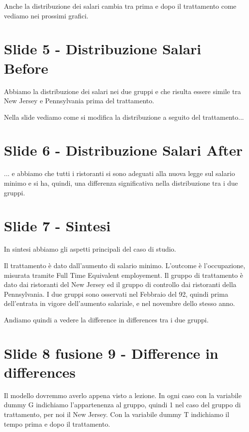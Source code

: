\documentclass{article}
\begin{document}
Anche la distribuzione dei salari cambia tra prima e dopo il trattamento come vediamo nei prossimi grafici.

\section{Slide 5 - Distribuzione Salari Before}

Abbiamo la distribuzione dei salari nei due gruppi e che risulta essere simile tra New Jersey e Pennsylvania prima del trattamento.

Nella slide vediamo come si modifica la distribuzione a seguito del trattamento...


\section{Slide 6 - Distribuzione Salari After}

... e abbiamo che tutti i ristoranti si sono adeguati alla nuova legge sul salario minimo e si ha, quindi, una differenza significativa nella distribuzione tra i due gruppi.

\section{Slide 7 - Sintesi} 

In sintesi abbiamo gli aspetti principali del caso di studio.

Il trattamento è dato dall'aumento di salario minimo. L'outcome è l'occupazione, misurata tramite Full Time Equivalent employement. Il gruppo di trattamento è dato dai ristoranti del New Jersey ed il gruppo di controllo dai ristoranti della Pennsylvania. I due gruppi sono osservati nel Febbraio del 92, quindi prima dell'entrata in vigore dell'aumento salariale, e nel novembre dello stesso anno.

Andiamo quindi a vedere la difference in differences tra i due gruppi.

\section{Slide 8 fusione 9 - Difference in differences }

Il modello dovremmo averlo appena visto a lezione. In ogni caso con la variabile dummy G indichiamo l'appartenenza al gruppo, quindi 1 nel caso del gruppo di trattamento, per noi il New Jersey. Con la variabile dummy T indichiamo il tempo prima e dopo il trattamento.
\end{document}

